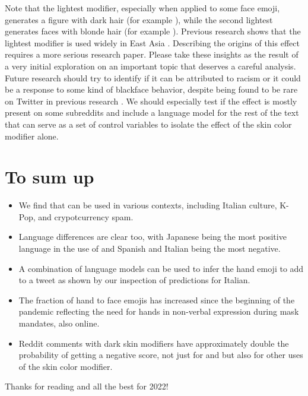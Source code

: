 \documentclass{article}
\begin{document}
Note that the lightest modifier, especially when applied to some face emoji, generates a figure with dark hair (for example ), while the second lightest generates faces with blonde hair (for example ). Previous research shows that the lightest modifier is used widely in East Asia \cite{Coats2018}. Describing the origins of this effect requires a more serious research paper. Please take these insights as the result of a very initial exploration on an important topic that deserves a careful analysis. Future research should try to identify if it can be attributed to racism or it could be a response to some kind of blackface behavior, despite being found to be rare on Twitter in previous research \cite{Robertson2018}. We should especially test if the effect is mostly present on some subreddits and include a language model for the rest of the text that can serve as a set of control variables to isolate the effect of the skin color modifier alone.



\section{To sum up}
\begin{itemize}
    \item We find that  can be used in various contexts, including Italian culture, K-Pop, and crypotcurrency spam.
    \item Language differences are clear too, with Japanese being the most positive language in the use of  and Spanish and Italian being the most negative.
    \item A combination of language models can be used to infer the hand emoji to add to a tweet as shown by our inspection of predictions for Italian.
    \item The fraction of hand to face emojis has increased since the beginning of the pandemic reflecting the need for hands in non-verbal expression during mask mandates, also online.
    \item Reddit comments with dark skin modifiers have approximately double the probability of getting a negative score, not just for  and  but also for other uses of the skin color modifier.
\end{itemize}

Thanks for reading and all the best for 2022!



\end{document}
